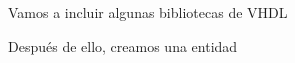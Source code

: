 \documentclass{article}
\begin{document}
Vamos a incluir algunas bibliotecas de VHDL



Después de ello, creamos una entidad


\end{document}
